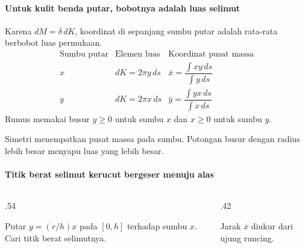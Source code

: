 \documentclass{../../kalkulus-ppt}
\begin{document}
\begin{frame}{\insertsection}
    \framesubtitle{Untuk kulit benda putar, bobotnya adalah luas selimut}
    \begin{teorema}
        Karena $dM=\delta\,dK$, koordinat di sepanjang sumbu putar
        adalah rata-rata berbobot luas permukaan.
        \[
            \begin{array}{c|c|c}
                \text{Sumbu putar} & \text{Elemen luas} & \text{Koordinat pusat massa}\\[2pt] \hline
                x & dK=2\pi y\,ds & \bar x=\dfrac{\int xy\,ds}{\int y\,ds}\\[5pt]
                y & dK=2\pi x\,ds & \bar y=\dfrac{\int yx\,ds}{\int x\,ds}
            \end{array}
        \]
        Rumus memakai busur $y\ge0$ untuk sumbu $x$ dan $x\ge0$ untuk sumbu $y$.
    \end{teorema}
    Simetri menempatkan pusat massa pada sumbu. Potongan busur dengan
    radius lebih besar menyapu luas yang lebih besar.
\end{frame}

\begin{frame}{\insertsection}
    \framesubtitle{Titik berat selimut kerucut bergeser menuju alas}
    \begin{columns}[c,onlytextwidth]
        \begin{column}{.54\textwidth}
            \begin{contoh}
                Putar $y=(r/h)x$ pada $[0,h]$ terhadap sumbu $x$.
                Cari titik berat selimutnya.
            \end{contoh}
        \end{column}
        \begin{column}{.42\textwidth}
            \centering
            \par
            \small Jarak $\bar x$ diukur dari ujung runcing.
        \end{column}
    \end{columns}
\end{frame}
\end{document}
